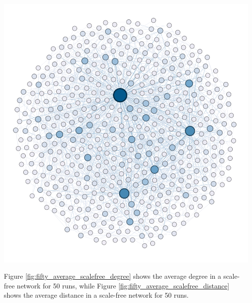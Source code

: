 \documentclass[journal]{IEEEtran}
\begin{document}
\begingroup
    \centering
    \includegraphics[width=\columnwidth]{images/scale-free.png}
    \label{fig:scalefree_network}
\endgroup

\newpage

\noindent Figure \ref{fig:fifty_average_scalefree_degree} shows the average degree in a scale-free network for 50 runs, while Figure \ref{fig:fifty_average_scalefree_distance} shows the average distance in a scale-free network for 50 runs.
\end{document}
